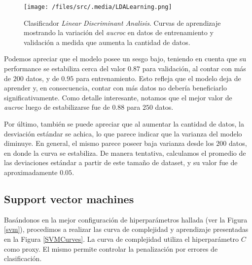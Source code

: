 \vspace{0.5em}
\begin{figure}[!htbp]
    \centering
    \texttt{[image: /files/src/.media/LDALearning.png]}
    \caption{Clasificador \textit{Linear Discriminant Analisis}. Curvas de aprendizaje mostrando la variación del \textit{aucroc} en datos de entrenamiento y validación a medida que aumenta la cantidad de datos\protect\footnotemark.}
    \label{LDALearning}
\end{figure}

Podemos apreciar que el modelo posee un sesgo bajo, teniendo en cuenta que su performance se estabiliza cerca del valor $0.87$ para validación, al contar con más de $200$ datos, y de $0.95$ para entrenamiento. Esto refleja que el modelo deja de aprender y, en consecuencia, contar con más datos no debería beneficiarlo significativamente. Como detalle interesante, notamos que el mejor valor de \textit{aucroc} luego de estabilizarse fue de $0.88$ para $250$ datos.

Por último, también se puede apreciar que al aumentar la cantidad de datos, la desviación estándar se achica, lo que parece indicar que la varianza del modelo diminuye. En general, el mismo parece poseer baja varianza desde los $200$ datos, en donde la curva se estabiliza. De manera tentativa, calculamos el promedio de las deviaciones estándar a partir de este tamaño de dataset, y su valor fue de aproximadamente $0.05$.


\subsection{Support vector machines}
Basándonos en la mejor configuración de hiperparámetros hallada (ver la Figura \ref{svm}), procedimos a realizar las curva de complejidad y aprendizaje presentadas en la Figura \ref{SVMCurves}.  La curva de complejidad utiliza el hiperparámetro $C$ como proxy. El mismo permite controlar la penalización por errores de clasificación. %

